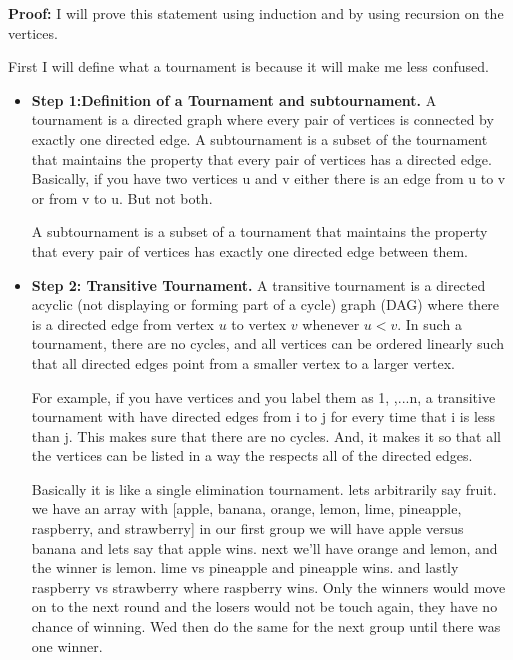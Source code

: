 \documentclass[10pt, AMS Euler]{article}
\begin{document}
\begin{enumerate}
            \noindent\textbf{Proof:} I will prove this statement using induction and by using recursion on the vertices.

            First I will define what a tournament is because it will make me less confused. \\
            \begin{itemize}
                \item \textbf{{Step 1:}Definition of a Tournament and subtournament.}
                    A tournament is a directed graph where every pair of vertices is connected by exactly one directed edge. A subtournament is a subset of the tournament that maintains the property that every pair of vertices has a directed edge. Basically, if you have two vertices u and v either there is an edge from u to v or from v to u. But not both. 

                    A subtournament is a subset of a tournament that maintains the property that every pair of vertices has exactly one directed edge between them. 
            
                \item \textbf{Step 2: Transitive Tournament.}
                    A transitive tournament is a directed acyclic (not displaying or forming part of a cycle) graph (DAG) where there is a directed edge from vertex $u$ to vertex $v$ whenever $u < v$. In such a tournament, there are no cycles, and all vertices can be ordered linearly such that all directed edges point from a smaller vertex to a larger vertex.

                    For example, if you have vertices and you label them as 1, ,...n, a transitive tournament with have directed edges from i to j for every time that i is less than j. This makes sure that there are no cycles. And, it makes it so that all the vertices can be listed in a way the respects all of the directed edges. 

                    Basically it is like a single elimination tournament. lets arbitrarily say fruit. we have an array with [apple, banana, orange, lemon, lime, pineapple, raspberry, and strawberry] in our first group we will have apple versus banana and lets say that apple wins. next we'll have orange and lemon, and the winner is lemon. lime vs pineapple and pineapple wins. and lastly raspberry vs strawberry where raspberry wins. Only the winners would move on to the next round and the losers would not be touch again, they have no chance of winning. Wed then do the same for the next group until there was one winner. 
            

\end{itemize}
\end{enumerate}
\end{document}
